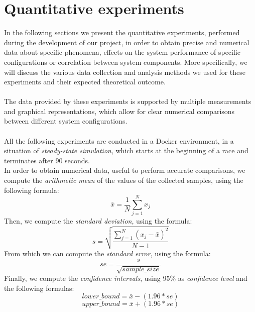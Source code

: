 \section{Quantitative experiments}\label{quant-ex}
In the following sections we present the quantitative experiments, performed during the development of our project, in order to obtain precise and numerical data about specific phenomena, effects on the system performance of specific configurations or correlation between system components. More specifically, we will discuss the various data collection and analysis methods we used for these experiments and their expected theoretical outcome. \\ \\
The data provided by these experiments is supported by multiple measurements and graphical representations, which allow for clear numerical comparisons between different system configurations. \\ \\
All the following experiments are conducted in a Docker environment, in a situation of \textit{steady-state simulation}, which starts at the beginning of a race and terminates after 90 seconds. \\
In order to obtain numerical data, useful to perform accurate comparisons, we compute the \textit{arithmetic mean} of the values of the collected samples, using the following formula:
\[\bar{x} = \frac{1}{N} \sum_{j=1}^N x_j\]
Then, we compute the \textit{standard deviation}, using the formula:
\[s = \sqrt{\frac{\sum_{j=1}^N (x_j-\bar{x})^2}{N-1}}\]
From which we can compute the \textit{standard error}, using the formula:
\[se = \frac{s}{\sqrt{sample\_size}}\]
Finally, we compute the \textit{confidence intervals}, using 95\% as \textit{confidence level} and the following formulas:
\[lower\_bound = \bar{x} - (1.96 * se)\]
\[upper\_bound = \bar{x} + (1.96 * se)\]

